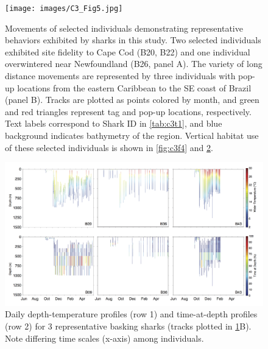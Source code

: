\begin{figure}[t!]
\centering
\texttt{[image: images/C3\_Fig5.jpg]}
\caption[Example long-range basking shark movements]{Movements of selected individuals demonstrating representative behaviors exhibited by sharks in this study. Two selected individuals exhibited site fidelity to Cape Cod (B20, B22) and one individual overwintered near Newfoundland (B26, panel A). The variety of long distance movements are represented by three individuals with pop-up locations from the eastern Caribbean to the SE coast of Brazil (panel B). Tracks are plotted as points colored by month, and green and red triangles represent tag and pop-up locations, respectively. Text labels correspond to Shark ID in \cref{tab:c3t1}, and blue background indicates bathymetry of the region. Vertical habitat use of these selected individuals is shown in \cref{fig:c3f4} and \cref{fig:c3f6}. }
\label{fig:c3f5}
\end{figure}

\begin{figure}[t!]
\centering
\includegraphics[width=1\textwidth]{images/C3_Fig6.jpg}
\caption[Representative basking shark vertical data for long-range movements]{Daily depth-temperature profiles (row 1) and time-at-depth profiles (row 2) for 3 representative basking sharks (tracks plotted in \cref{fig:c3f5}B). Note differing time scales (x-axis) among individuals.}
\label{fig:c3f6}
\end{figure}

